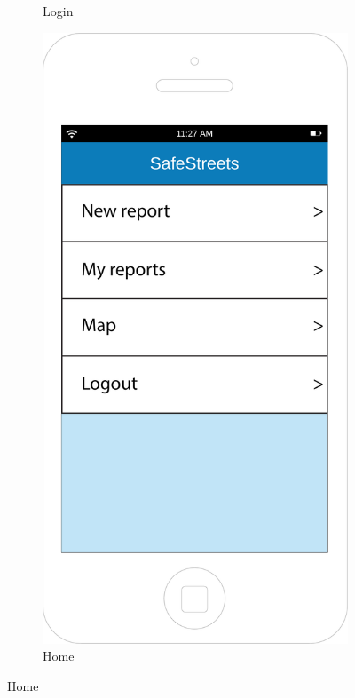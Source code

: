 \documentclass[12pt,a4paper]{report}
\begin{document}
\begin{figure}[h]
\begin{subfigure}{0.5\textwidth}
			\caption{Login}
			\label{Login}
		\end{subfigure}
		\begin{subfigure}{0.5\textwidth}
			\includegraphics[scale=0.25, center]{Home}
			\caption{Home}
			\label{Home}
		\end{subfigure}
		\end{figure}
\end{document}
